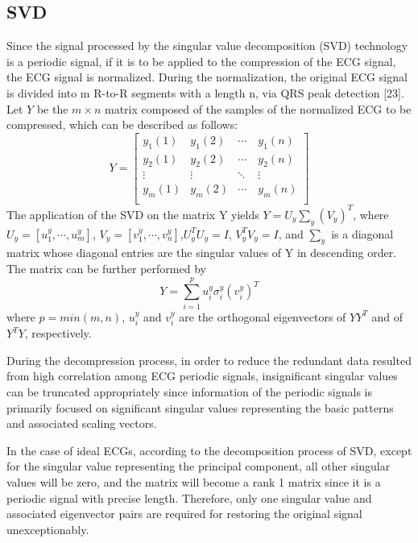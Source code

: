 \documentclass[journal]{IEEEtran}
\begin{document}
\subsection{SVD}
Since the signal processed by the singular value decomposition (SVD) technology is a periodic signal, if it is to be applied to the compression of the ECG signal, the ECG signal is normalized. During the normalization, the original ECG signal is divided into m R-to-R segments with a length n, via QRS peak detection [23]. Let $Y$ be the $m\times n$ matrix composed of the samples of the normalized ECG to be compressed, which can be described as follows:
\begin{equation}
Y
=\begin{bmatrix}
y_1(1)  &  y_1(2)  & \cdots\ &y_1(n)\\
y_2(1)  &  y_2(2)  & \cdots\ & y_2(n)\\
\vdots  & \vdots   & \ddots  & \vdots  \\
y_m(1)  & y_m(2)   & \cdots\ & y_m(n)\\
\end{bmatrix}
\end{equation}
The application of the SVD on the matrix Y yields $Y=U_y\sum_y(V_y)^T$, where $U_y=[u_1^y,\cdots,u_m^y]$, $V_y=[v_1^y,\cdots, v_n^y]$,$U_y^T U_y=I$, $V_y^T V_y=I$, and $\sum_y$ is a diagonal matrix whose diagonal entries are the singular values of Y in descending order. The matrix can be further performed by
\begin{equation}
Y=\sum\limits_{i=1}^{p}u_{i}^{y}\sigma_{i}^{y}(v_{i}^{y})^{T}
\end{equation}
where $p = min(m, n)$, $u_{i}^{y}$ and $v_{i}^{y}$ are the orthogonal eigenvectors of $YY^T$ and of $Y^TY$, respectively.

During the decompression process, in order to reduce the redundant data resulted from high correlation among ECG periodic signals, insignificant singular values can be truncated appropriately since information of the periodic signals is primarily focused on significant singular values representing the basic patterns and associated scaling vectors.

In the case of ideal ECGs, according to the decomposition process of SVD, except for the singular value representing the principal component, all other singular values will be zero, and the matrix will become a rank 1 matrix since it is a periodic signal with precise length. Therefore, only one singular value and associated eigenvector pairs are required for restoring the original signal unexceptionably.
\end{document}
